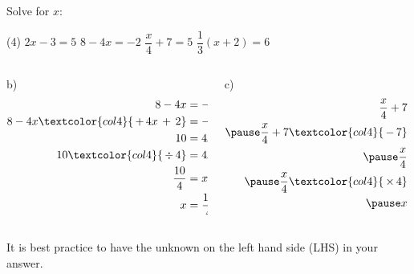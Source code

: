 \documentclass[aspectratio=169,10pt]{beamer}
\begin{document}
\begin{frame}
  \begin{example}
    Solve for $x$:
    \begin{tasks}(4)
      \task $2x-3=5$
      \task $8-4x=-2$
      \task $\dfrac{x}{4}+7=5$
      \task $\dfrac{1}{3}(x+2)=6$
    \end{tasks}
  \end{example}
  \begin{solution}[]
    \vspace{-1em}
    \begin{columns}[t]
    \begin{column}{.4\textwidth}
    b) $ $\vspace{-2em}\[
      \begin{aligned}
         8-4x&=-2\\
         8-4x\textcolor{col4}{\,+\,4x\,+\,2}&=-2\textcolor{col4}{\,+\,4x\,+\,2}\\
         10&=4x\\
         10\textcolor{col4}{\,\div\,4}&=4x\textcolor{col4}{\,\div\,4}\\
         \frac{10}{4}&=x\\
         x&=\frac{10}{4}=\frac{5}{2}=2.5
      \end{aligned}
      \]
    \end{column}
      \begin{column}{.4\textwidth}
    c) $ $\vspace{-1em}\[
      \begin{aligned}
         \frac{x}{4}+7&=5\\\pause
         \frac{x}{4}+7\textcolor{col4}{\,-\,7}&=5\textcolor{col4}{\,-\,7}\\\pause
         \frac{x}{4}&=-2\\\pause
         \frac{x}{4}\textcolor{col4}{\,\times\,4}&=-2\textcolor{col4}{\,\times\,4}\\\pause
         x&=-8
      \end{aligned}
      \]
    \end{column}
  \end{columns}
  \end{solution}
  \vspace{-7pt}
    \begin{note}
  It is best practice to have the unknown on the left hand side (LHS) in your answer.
  \end{note}
\end{frame}
\end{document}
